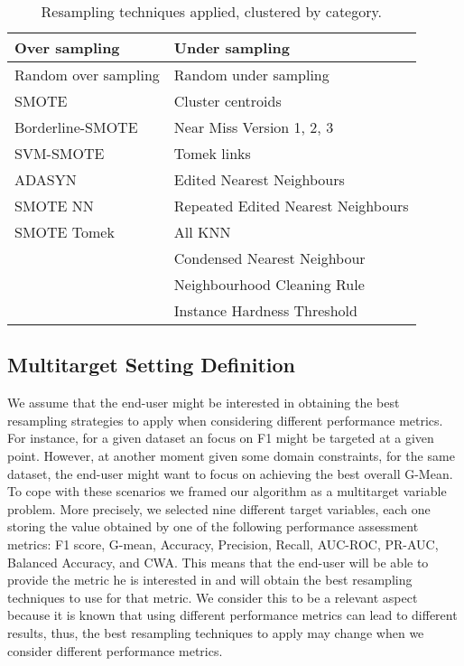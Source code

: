 \documentclass{article}
\begin{document}
\begin{table}[ht]
\centering
\begin{tabular}{ll}
\toprule
\textbf{Over sampling} & \textbf{Under sampling} \\
\midrule
Random over sampling & Random under sampling \\
SMOTE & Cluster centroids \\
Borderline-SMOTE & Near Miss Version 1, 2, 3 \\
SVM-SMOTE & Tomek links \\
ADASYN & Edited Nearest Neighbours \\
SMOTE NN & Repeated Edited Nearest Neighbours \\
SMOTE Tomek & All KNN \\
& Condensed Nearest Neighbour \\
& Neighbourhood Cleaning Rule \\
& Instance Hardness Threshold \\
\bottomrule
\end{tabular}
\caption{Resampling techniques applied, clustered by category.}\label{samplingtechniques}
\end{table}


 

\subsection{Multitarget Setting Definition}\label{subsec:setting}

We assume that the end-user might be interested in obtaining the best resampling strategies to apply when considering different performance metrics. For instance, for a given dataset an focus on F1 might be targeted at a given point. However, at another moment given some domain constraints, for the same dataset, the end-user might want to focus on achieving the best overall G-Mean. To cope with these scenarios we framed our algorithm as a multitarget variable problem. More precisely, we selected nine different target variables, each one storing the value obtained by one of the following performance assessment metrics: F1 score, G-mean, Accuracy, Precision, Recall, AUC-ROC, PR-AUC, Balanced Accuracy, and CWA. This means that the end-user will be able to provide the metric he is interested in and will obtain the best resampling techniques to use for that metric. We consider this to be a relevant aspect because it is known that using different performance metrics can lead to different results, thus, the best resampling techniques to apply may change when we consider different performance metrics.
\end{document}
